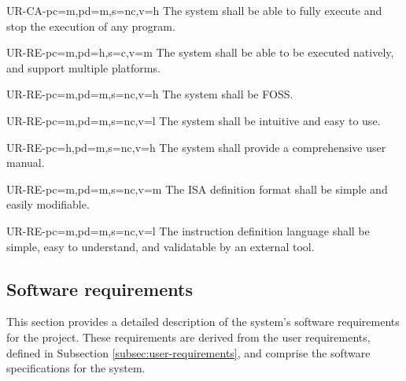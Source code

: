 \begin{userReq}{UR-CA-}{pc=m,pd=m,s=nc,v=h}
  The system shall be able to fully execute and stop the execution of any program.
\end{userReq}


\setcounter{i}{1}

\begin{userReq}{UR-RE-}{pc=m,pd=h,s=c,v=m}
  The system shall be able to be executed natively, and support multiple platforms.
\end{userReq}

\begin{userReq}{UR-RE-}{pc=m,pd=m,s=nc,v=h}
  The system shall be \gls{FOSS}.
\end{userReq}

\begin{userReq}{UR-RE-}{pc=m,pd=m,s=nc,v=l}
  The system shall be intuitive and easy to use.
\end{userReq}

\begin{userReq}{UR-RE-}{pc=h,pd=m,s=nc,v=h}
  The system shall provide a comprehensive user manual.
\end{userReq}

\begin{userReq}{UR-RE-}{pc=m,pd=m,s=nc,v=m}
  The \gls{ISA} definition format shall be simple and easily modifiable.
\end{userReq}

\begin{userReq}{UR-RE-}{pc=m,pd=m,s=nc,v=l}
  The instruction definition language shall be simple, easy to understand, and  validatable by an external tool.
\end{userReq}


\FloatBarrier  %


\subsection{Software requirements}\label{subsec:soft-requirements}
This section provides a detailed description of the system's software requirements for the project. These requirements are derived from the user requirements, defined in Subsection \ref{subsec:user-requirements}, and comprise the software specifications for the system.


